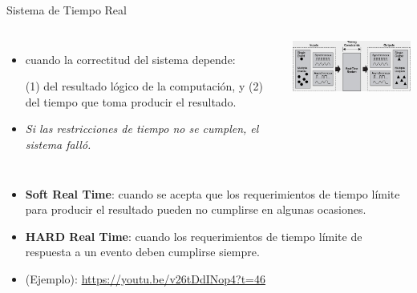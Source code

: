 \documentclass[8pt,aspectratio=169,compress]{beamer}
\begin{document}
\begin{frame}{Sistema de Tiempo Real}

   \begin{columns}[onlytextwidth,T]
     \column{\dimexpr\linewidth-70mm-5mm}

	\begin{itemize}
\bigskip
  \item[REAL-TIME-SYSTEM] cuando la correctitud del sistema depende:

\bigskip
(1) del resultado lógico de la computación, y
\bigskip
(2) del tiempo que toma producir el resultado.

\bigskip
  \item[FALLO] \textit{Si las restricciones de tiempo no se cumplen, el sistema falló.}

\bigskip

	\end{itemize}

      \column{70mm}
    \includegraphics[width=70mm]{images/rts.jpg}

    \end{columns}
\bigskip
\begin{itemize}
\item \textbf{Soft Real Time}: cuando se acepta que los requerimientos de tiempo límite para producir el resultado pueden no cumplirse en algunas ocasiones.
\bigskip
\item \textbf{HARD Real Time}: cuando los requerimientos de tiempo límite de respuesta a un evento deben cumplirse siempre.
\bigskip
 \item[Manipulador] (Ejemplo): {\small \url{https://youtu.be/v26tDdINop4?t=46}}
\end{itemize}
\end{frame}
\end{document}
